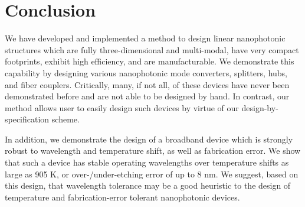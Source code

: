 \documentclass[letterpaper,10pt]{article}
\begin{document}
\section{Conclusion}
We have developed and implemented a method to design linear nanophotonic structures
    which are fully three-dimensional and multi-modal,
    have very compact footprints,
    exhibit high efficiency, and
    are manufacturable.
We demonstrate this capability by designing various nanophotonic mode converters,
    splitters, hubs, and fiber couplers.
Critically, many, if not all, of these devices have never been demonstrated before
    and are not able to be designed by hand.
In contrast, our method allows user to easily design such devices
    by virtue of our design-by-specification scheme.

In addition, we demonstrate the design of a broadband device 
    which is strongly robust to wavelength and temperature shift,
    as well as fabrication error.
We show that such a device has stable operating wavelengths 
    over temperature shifts as large as 905 K,
    or over-/under-etching error of up to 8 nm.
We suggest, based on this design, that wavelength tolerance
    may be a good heuristic to the design of temperature and fabrication-error
    tolerant nanophotonic devices.
\end{document}
